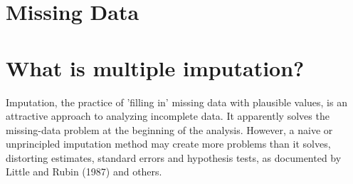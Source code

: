 

\newpage

\section{Missing Data}

\section{What is multiple imputation?}

Imputation, the practice of 'filling in' missing data with plausible values, is an attractive approach to analyzing incomplete data. It apparently solves the missing-data problem at the beginning of the analysis. However, a naive or unprincipled imputation method may create more problems than it solves, distorting estimates, standard errors and hypothesis tests, as documented by Little and Rubin (1987) and others.







